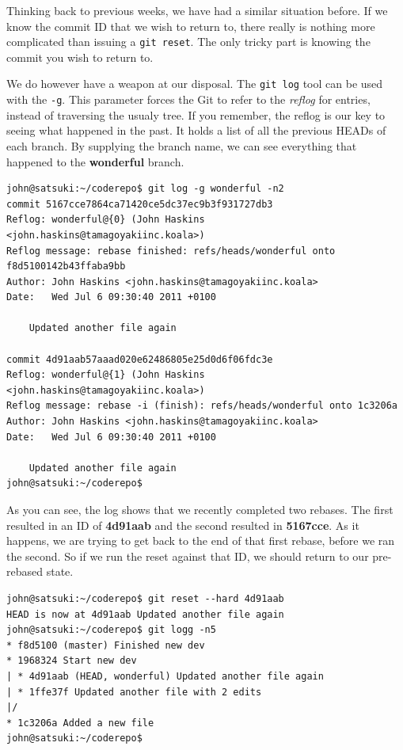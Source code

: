 Thinking back to previous weeks, we have had a similar situation before.  If we know the commit ID that we wish to return to, there really is nothing more complicated than issuing a \texttt{git reset}.  The only tricky part is knowing the commit you wish to return to.

We do however have a weapon at our disposal.  The \texttt{git log} tool can be used with the \texttt{-g}.  This parameter forces the Git to refer to the \emph{reflog} for entries, instead of traversing the usualy tree.  If you remember, the reflog is our key to seeing what happened in the past.  It holds a list of all the previous HEADs of each branch.  By supplying the branch name, we can see everything that happened to the \textbf{wonderful} branch.

\begin{Verbatim}
john@satsuki:~/coderepo$ git log -g wonderful -n2
commit 5167cce7864ca71420ce5dc37ec9b3f931727db3
Reflog: wonderful@{0} (John Haskins <john.haskins@tamagoyakiinc.koala>)
Reflog message: rebase finished: refs/heads/wonderful onto f8d5100142b43ffaba9bb
Author: John Haskins <john.haskins@tamagoyakiinc.koala>
Date:   Wed Jul 6 09:30:40 2011 +0100

    Updated another file again

commit 4d91aab57aaad020e62486805e25d0d6f06fdc3e
Reflog: wonderful@{1} (John Haskins <john.haskins@tamagoyakiinc.koala>)
Reflog message: rebase -i (finish): refs/heads/wonderful onto 1c3206a
Author: John Haskins <john.haskins@tamagoyakiinc.koala>
Date:   Wed Jul 6 09:30:40 2011 +0100

    Updated another file again
john@satsuki:~/coderepo$ 
\end{Verbatim}

As you can see, the log shows that we recently completed two rebases.  The first resulted in an ID of \textbf{4d91aab} and the second resulted in \textbf{5167cce}.  As it happens, we are trying to get back to the end of that first rebase, before we ran the second.  So if we run the reset against that ID, we should return to our pre-rebased state.

\begin{Verbatim}
john@satsuki:~/coderepo$ git reset --hard 4d91aab
HEAD is now at 4d91aab Updated another file again
john@satsuki:~/coderepo$ git logg -n5
* f8d5100 (master) Finished new dev
* 1968324 Start new dev
| * 4d91aab (HEAD, wonderful) Updated another file again
| * 1ffe37f Updated another file with 2 edits
|/  
* 1c3206a Added a new file
john@satsuki:~/coderepo$ 
\end{Verbatim}

